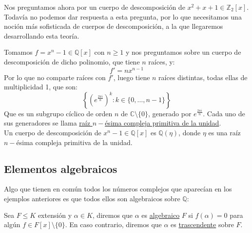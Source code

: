 \noindent
Nos preguntamos ahora por un cuerpo de descomposición de $x^2+x+1\in \mathbb{Z}_2[x]$. Todavía no podemos dar respuesta a esta pregunta, por lo que necesitamos una noción más sofisticada de cuerpos de descomposición, a la que llegaremos desarrollando esta teoría.

\begin{ejemplo}
    Tomamos $f=x^n-1\in \mathbb{Q}[x]$ con $n\geq 1$ y nos preguntamos sobre un cuerpo de descomposición de dicho polinomio, que tiene $n$ raíces, y:
    \begin{equation*}
        f' = nx^{n-1}
    \end{equation*}
    Por lo que no comparte raíces con $f'$, luego tiene $n$ raíces distintas, todas ellas de multiplicidad 1, que son:
    \begin{equation*}
        \left\{{\left(e^{\frac{2\pi i}{n}}\right)}^{k}:k\in \{0,\ldots,n-1\}\right\}
    \end{equation*}
    Que es un subgrupo cíclico de orden $n$ de $\mathbb{C}\setminus\{0\}$, generado por $e^{\frac{2\pi i}{n}}$. Cada uno de sus generadores se llama \underline{raíz $n-$ésima compleja primitiva de la unidad}.\\

    \noindent
    Un cuerpo de descomposición de $x^n-1\in \mathbb{Q}[x]$ es $\mathbb{Q}(\eta)$, donde $\eta$ es una raíz $n-$ésima compleja primitiva de la unidad.
\end{ejemplo}

\subsection{Elementos algebraicos}
\noindent
Algo que tienen en común todos los números complejos que aparecían en los ejemplos anteriores es que todos ellos son algebraicos sobre $\mathbb{Q}$:

\begin{definicion}
    Sea $F\leq K$ extensión y $\alpha\in K$, diremos que $\alpha$ es \underline{algebraico}  $F$ si $f(\alpha)=0$ para algún $f\in F[x]\setminus\{0\}$. En caso contrario, diremos que $\alpha$ es \underline{trascendente} sobre $F$.
\end{definicion}

